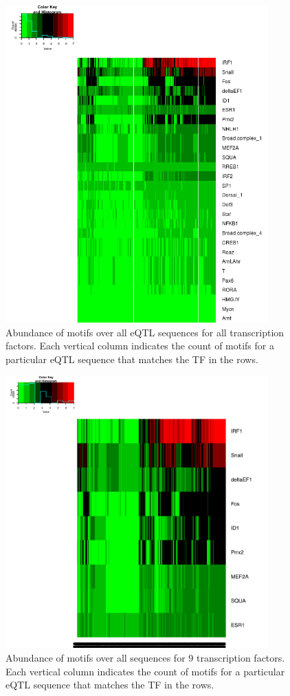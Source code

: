 \documentclass[12pt]{article}
\begin{document}
\begin{figure}[!htbp]
\centering
\includegraphics[width= 0.9\textwidth]{heatMapAllTFs.png}
\caption{Abundance of motifs over all eQTL sequences for all transcription factors. Each vertical column indicates the count of motifs for a
particular eQTL sequence that matches the TF in the rows. } 
\label{heatmap}
\end{figure}

\begin{figure}[!htbp]
\centering
\includegraphics[width= 0.9\textwidth]{HeatmapTopNineTFs.pdf}
\caption{Abundance of motifs over all sequences for 9 transcription factors. Each vertical column indicates the count of motifs for a
particular eQTL sequence that matches the TF in the rows.} 
\label{heatmap2}
\end{figure}
\end{document}
